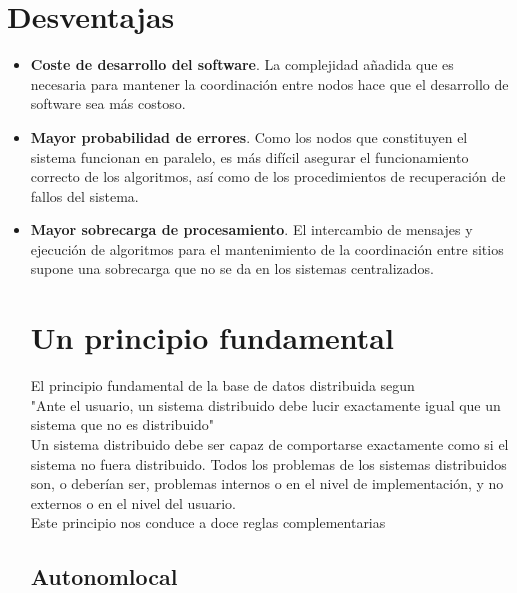 \documentclass[10pt,a4paper,oneside]{article}
\begin{document}
\section{Desventajas\cite {Olarte}}
\begin {itemize}
\item {\bf Coste de desarrollo del software}. La complejidad a\~nadida que es necesaria para mantener la coordinaci\'on entre nodos hace que el desarrollo de software sea m\'as costoso.
\item {\bf Mayor probabilidad de errores}. Como los nodos que constituyen el sistema funcionan en paralelo, es m\'as dif\'icil asegurar el funcionamiento correcto de los algoritmos, as\'i como de los procedimientos de recuperaci\'on de fallos del sistema.
\item {\bf Mayor sobrecarga de procesamiento}. El intercambio de mensajes y ejecuci\'on de algoritmos para el mantenimiento de la coordinaci\'on entre sitios supone una sobrecarga que no se da en los sistemas centralizados.



\section{Un principio fundamental}
El principio fundamental de la base de datos distribuida segun \cite{Date}
\\"Ante el usuario, un sistema distribuido debe lucir exactamente igual que un sistema que no es distribuido"\\
Un sistema distribuido debe ser capaz de comportarse exactamente como si el sistema no fuera distribuido. Todos los problemas de los sistemas distribuidos son, o deber\'ian ser, problemas internos o en el nivel de implementaci\'on, y no externos o en el nivel del usuario.
\\Este principio nos conduce a doce reglas complementarias \\

\subsection{Autonom local}


\end{itemize}
\end{document}
